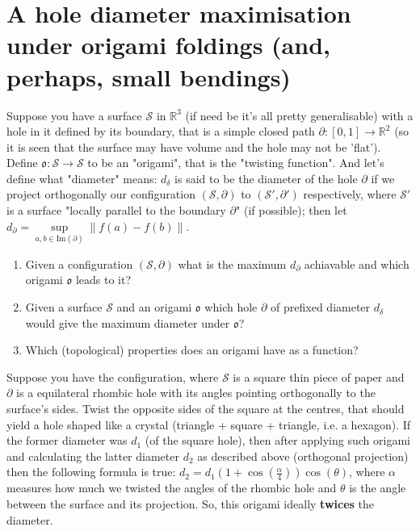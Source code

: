 \section{A hole diameter maximisation under origami foldings (and, perhaps, small bendings)}

Suppose you have a surface $\mathcal S$ in $\mathbb{R}^3$ (if need be it's all pretty generalisable) with a hole in it defined by its boundary, that is a simple closed path $\partial : [0, 1] \to \mathbb{R}^2$ (so it is seen that the surface may have volume and the hole may not be 'flat'). Define $\mathfrak{o}: \mathcal{S} \to \mathcal{S}$ to be an "origami", that is the "twisting function". And let's define what "diameter" means: $d_\delta$ is said to be the diameter of the hole $\partial$ if we project orthogonally our configuration $(\mathcal S, \partial)$ to $(\mathcal S', \partial')$ respectively, where $\mathcal S'$ is a surface "locally parallel to the boundary $\partial$" (if possible); then let $d_\partial = \sup\limits_{a, b \in \text{Im}(\partial)}\|f(a) - f(b)\|$.

\begin{enumerate}
\item Given a configuration $(\mathcal S, \partial)$ what is the maximum $d_\partial$ achiavable and which origami $\mathfrak o$ leads to it?
\item Given a surface $\mathcal S$ and an origami $\mathfrak o$ which hole $\partial$ of prefixed diameter $d_\delta$ would give the maximum diameter under $\mathfrak o$?
\item Which (topological) properties does an origami have as a function?
\end{enumerate}

\begin{example}
Suppose you have the configuration, where $\mathcal S$ is a square thin piece of paper and $\partial$ is a equilateral rhombic hole with its angles pointing orthogonally to the surface's sides. Twist the opposite sides of the square at the centres, that should yield a hole shaped like a crystal (triangle + square + triangle, i.e. a hexagon). If the former diameter was $d_1$ (of the square hole), then after applying such origami and calculating the latter diameter $d_2$ as described above (orthogonal projection) then the following formula is true: $d_2 = d_1(1 + \cos(\frac \alpha 4))\cos(\theta)$, where $\alpha$ measures how much we twisted the angles of the rhombic hole and $\theta$ is the angle between the surface and its projection. So, this origami ideally {\bf twices} the diameter.
\end{example}